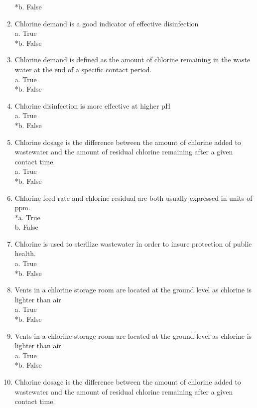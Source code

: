 \begin{enumerate}
*b. False \\
\item Chlorine demand is a good indicator of effective disinfection \\
a. True \\
*b. False \\
\item Chlorine demand is defined as the amount of chlorine remaining in the waste water at the end of a specific contact period. \\
a. True \\
*b. False \\
\item Chlorine disinfection is more effective at higher pH \\
a. True \\
*b. False \\
\item Chlorine dosage is the difference between the amount of chlorine added to wastewater and the amount of residual chlorine remaining after a given contact time. \\
a. True \\
*b. False \\
\item Chlorine feed rate and chlorine residual are both usually expressed in units of ppm. \\
*a. True \\
b. False \\
\item Chlorine is used to sterilize wastewater in order to insure protection of public health. \\
a. True \\
*b. False \\
\item Vents in a chlorine storage room are located at the ground level as chlorine is lighter than air \\
a. True \\
*b. False \\
\item Vents in a chlorine storage room are located at the ground level as chlorine is lighter than air \\
a. True \\
*b. False \\
\item Chlorine dosage is the difference between the amount of chlorine added to wastewater and the amount of residual chlorine remaining after a given contact time. \\

\end{enumerate}
